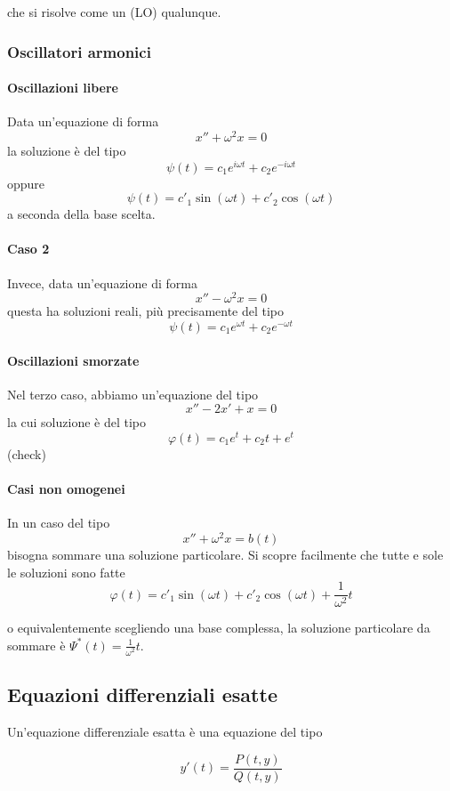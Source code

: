 \documentclass[a4paper,12pt]{article}
\begin{document}
che si risolve come un (LO) qualunque.

\subsubsection{Oscillatori armonici}
\paragraph{Oscillazioni libere}
Data un'equazione di forma
$$x''+\omega^2 x=0$$
la soluzione è del tipo
$$\psi(t) = c_1 e^{i\omega t} + c_2 e^{-i\omega t}$$
oppure
$$\psi(t) = c'_1\sin(\omega t) + c'_2\cos(\omega t)$$
a seconda della base scelta.

\paragraph{Caso 2}
Invece, data un'equazione di forma
$$x''-\omega^2 x=0$$
questa ha soluzioni reali, più precisamente del tipo
$$\psi(t) = c_1 e^{\omega t} + c_2 e^{-\omega t}$$

\paragraph{Oscillazioni smorzate}
Nel terzo caso, abbiamo un'equazione del tipo
$$x''-2x' +x=0$$
la cui soluzione è del tipo
$$\varphi(t) = c_1e^t +c_2 t + e^t$$
(check)

\paragraph{Casi non omogenei}
In un caso del tipo
$$x''+\omega^2 x=b(t)$$
bisogna sommare una soluzione particolare. Si scopre facilmente che tutte e sole le soluzioni sono fatte
$$\varphi(t) = c'_1\sin(\omega t) + c'_2\cos(\omega t) + \frac{1}{\omega^2}t$$

o equivalentemente scegliendo una base complessa, la soluzione particolare da sommare è $\Psi^*(t) = \frac{1}{\omega^2}t$.

\subsection{Equazioni differenziali esatte}

Un'equazione differenziale esatta è una equazione del tipo

\begin{equation}\label{eq-diff-esatte}
y'(t)=\frac{P(t, y)}{Q(t,y)} 
\end{equation}
\end{document}
